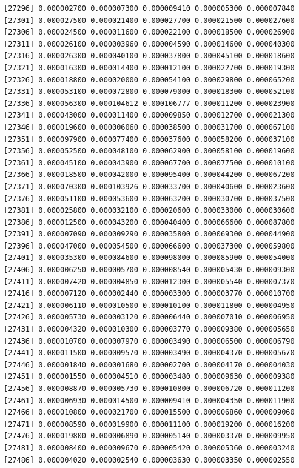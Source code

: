 \documentclass[]{article}
\begin{document}
\begin{verbatim}
[27296] 0.000002700 0.000007300 0.000009410 0.000005300 0.000007840
[27301] 0.000027500 0.000021400 0.000027700 0.000021500 0.000027600
[27306] 0.000024500 0.000011600 0.000022100 0.000018500 0.000026900
[27311] 0.000026100 0.000003960 0.000004590 0.000014600 0.000040300
[27316] 0.000026300 0.000040100 0.000037800 0.000045100 0.000018600
[27321] 0.000016300 0.000014400 0.000012100 0.000022700 0.000019300
[27326] 0.000018800 0.000020000 0.000054100 0.000029800 0.000065200
[27331] 0.000053100 0.000072800 0.000079000 0.000018300 0.000052100
[27336] 0.000056300 0.000104612 0.000106777 0.000011200 0.000023900
[27341] 0.000043000 0.000011400 0.000009850 0.000012700 0.000021300
[27346] 0.000019600 0.000006060 0.000038500 0.000031700 0.000067100
[27351] 0.000097900 0.000077400 0.000037600 0.000058200 0.000037100
[27356] 0.000052500 0.000048100 0.000062900 0.000058100 0.000019600
[27361] 0.000045100 0.000043900 0.000067700 0.000077500 0.000010100
[27366] 0.000018500 0.000042000 0.000095400 0.000044200 0.000067200
[27371] 0.000070300 0.000103926 0.000033700 0.000040600 0.000023600
[27376] 0.000051100 0.000053600 0.000063200 0.000030700 0.000037500
[27381] 0.000025800 0.000032100 0.000020600 0.000033000 0.000030600
[27386] 0.000012500 0.000043200 0.000040400 0.000066600 0.000087800
[27391] 0.000007090 0.000009290 0.000035800 0.000069300 0.000044900
[27396] 0.000047000 0.000054500 0.000066600 0.000037300 0.000059800
[27401] 0.000035300 0.000084600 0.000098000 0.000085900 0.000054000
[27406] 0.000006250 0.000005700 0.000008540 0.000005430 0.000009300
[27411] 0.000007420 0.000004850 0.000012300 0.000005540 0.000007370
[27416] 0.000007120 0.000002440 0.000003300 0.000003770 0.000010700
[27421] 0.000006110 0.000010500 0.000010100 0.000011800 0.000004950
[27426] 0.000005730 0.000003120 0.000006440 0.000007010 0.000006950
[27431] 0.000004320 0.000010300 0.000003770 0.000009380 0.000005650
[27436] 0.000010700 0.000007970 0.000003490 0.000006500 0.000006790
[27441] 0.000011500 0.000009570 0.000003490 0.000004370 0.000005670
[27446] 0.000001840 0.000001680 0.000002700 0.000004170 0.000004030
[27451] 0.000001550 0.000004510 0.000003480 0.000009630 0.000009380
[27456] 0.000008870 0.000005730 0.000010800 0.000006720 0.000011200
[27461] 0.000006930 0.000014500 0.000009410 0.000004350 0.000011900
[27466] 0.000010800 0.000021700 0.000015500 0.000006860 0.000009060
[27471] 0.000008590 0.000019900 0.000011100 0.000019200 0.000016200
[27476] 0.000019800 0.000006890 0.000005140 0.000003370 0.000009950
[27481] 0.000008400 0.000009670 0.000005420 0.000005360 0.000003240
[27486] 0.000004020 0.000002540 0.000003630 0.000003350 0.000002550

\end{verbatim}
\end{document}
